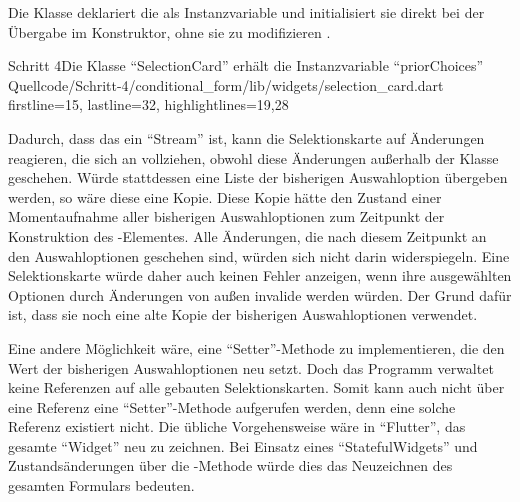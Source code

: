 Die Klasse  deklariert die  als Instanzvariable 
und initialisiert sie direkt bei der Übergabe im Konstruktor,
ohne sie zu modifizieren .

\begin{alexlisting}{Schritt 4}{Die Klasse \enquote{SelectionCard} erhält die Instanzvariable \enquote{priorChoices}}
  {Quellcode/Schritt-4/conditional_form/lib/widgets/selection_card.dart}
  {firstline=15, lastline=32, highlightlines={19,28}}
  \label{lst:Schritt4SelectionCardPriorChoices}
\end{alexlisting} 


Dadurch, dass das  ein \enquote{Stream} ist,
kann die Selektionskarte auf Änderungen reagieren,
die sich an  vollziehen,
obwohl diese Änderungen außerhalb der Klasse geschehen.
Würde stattdessen eine Liste der bisherigen Auswahloption übergeben werden,
so wäre diese eine Kopie.
Diese Kopie hätte den Zustand einer Momentaufnahme aller bisherigen Auswahloptionen zum Zeitpunkt der Konstruktion des -Elementes.
Alle Änderungen,
die nach diesem Zeitpunkt an den Auswahloptionen geschehen sind,
würden sich nicht darin widerspiegeln.
Eine Selektionskarte würde daher auch keinen Fehler anzeigen,
wenn ihre ausgewählten Optionen durch Änderungen von außen invalide werden würden.
Der Grund dafür ist,
dass sie noch eine alte Kopie der bisherigen Auswahloptionen verwendet.

Eine andere Möglichkeit wäre,
eine \enquote{Setter}-Methode zu implementieren,
die den Wert der bisherigen Auswahloptionen neu setzt.
Doch das Programm verwaltet keine Referenzen auf alle gebauten Selektionskarten.
Somit kann auch nicht über eine Referenz eine \enquote{Setter}-Methode aufgerufen werden,
denn eine solche Referenz existiert nicht. 
Die übliche Vorgehensweise wäre in \enquote{Flutter},
das gesamte \enquote{Widget} neu zu zeichnen.
Bei Einsatz eines \enquote{StatefulWidgets} und Zustandsänderungen über die -Methode würde dies das Neuzeichnen des gesamten Formulars bedeuten.

